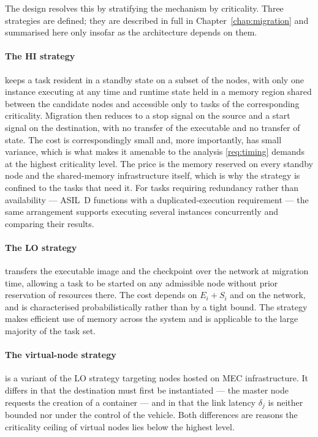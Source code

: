 The design resolves this by stratifying the mechanism by criticality. Three
strategies are defined; they are described in full in
Chapter~\ref{chap:migration} and summarised here only insofar as the
architecture depends on them.

\paragraph{The \textsf{HI} strategy} keeps a task resident in a standby state
on a subset of the nodes, with only one instance executing at any time and
runtime state held in a memory region shared between the candidate nodes and
accessible only to tasks of the corresponding criticality. Migration then
reduces to a stop signal on the source and a start signal on the destination,
with no transfer of the executable and no transfer of state. The cost is
correspondingly small and, more importantly, has small variance, which is what
makes it amenable to the analysis \cref{req:timing} demands at the highest
criticality level. The price is the memory reserved on every standby node and
the shared-memory infrastructure itself, which is why the strategy is confined
to the tasks that need it. For tasks requiring redundancy rather than
availability --- ASIL~D functions with a duplicated-execution requirement ---
the same arrangement supports executing several instances concurrently and
comparing their results.

\paragraph{The \textsf{LO} strategy} transfers the executable image and the
checkpoint over the network at migration time, allowing a task to be started on
any admissible node without prior reservation of resources there. The cost
depends on $E_i + S_i$ and on the network, and is characterised
probabilistically rather than by a tight bound. The strategy makes efficient
use of memory across the system and is applicable to the large majority of the
task set.

\paragraph{The virtual-node strategy} is a variant of the \textsf{LO} strategy
targeting nodes hosted on MEC infrastructure. It differs in that the
destination must first be instantiated --- the master node requests the
creation of a container --- and in that the link latency $\delta_j$ is neither
bounded nor under the control of the vehicle. Both differences are reasons the
criticality ceiling of virtual nodes lies below the highest level.

